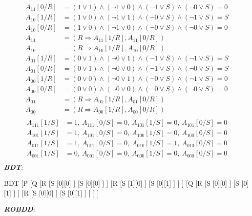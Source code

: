 \documentclass[a4paper,12pt]{article}
\begin{document}
\begin{enumerate}
\begin{align*}
		A_{11}[0/R]&=(1\lor 1)\land(\neg 1\lor 0)\land(\neg 1\lor S)\land (\neg 0\lor S)=0\\
		A_{10}[1/R]&=(1\lor 0)\land(\neg 1\lor 1)\land(\neg 0\lor S)\land (\neg 1\lor S)=S\\
		A_{10}[0/R]&=(1\lor 0)\land(\neg 1\lor 0)\land(\neg 0\lor S)\land (\neg 0\lor S)=0\\
		A_{11}&=(R\Rightarrow A_{11}[1/R],A_{11}[0/R])\\
		A_{10}&=(R\Rightarrow A_{10}[1/R],A_{10}[0/R])\\
		A_{01}[1/R]&=(0\lor 1)\land(\neg 0\lor 1)\land(\neg 1\lor S)\land (\neg 1\lor S)=S\\
		A_{01}[0/R]&=(0\lor 1)\land(\neg 0\lor 0)\land(\neg 1\lor S)\land (\neg 0\lor S)=S\\
		A_{00}[1/R]&=(0\lor 0)\land(\neg 0\lor 1)\land(\neg 0\lor S)\land (\neg 1\lor S)=0\\
		A_{00}[0/R]&=(0\lor 0)\land(\neg 0\lor 0)\land(\neg 0\lor S)\land (\neg 0\lor S)=0\\
		A_{01}&=(R\Rightarrow A_{01}[1/R],A_{01}[0/R])\\
		A_{00}&=(R\Rightarrow A_{00}[1/R],A_{00}[0/R])\\
	\end{align*}
	\begin{align*}
		A_{111}[1/S]&=1,\>A_{111}[0/S]=0,\>A_{101}[1/S]=0,\>A_{101}[0/S]=0\\
		A_{101}[1/S]&=1,\>A_{101}[0/S]=0,\>A_{100}[1/S]=0,\>A_{100}[0/S]=0\\
		A_{011}[1/S]&=1,\>A_{011}[0/S]=0,\>A_{010}[1/S]=1,\>A_{010}[0/S]=0\\
		A_{001}[1/S]&=0,\>A_{001}[0/S]=0,\>A_{000}[1/S]=0,\>A_{000}[0/S]=0\\
	\end{align*}
	\emph{\textbf{BDT}:}\\
	\begin{center}
		\begin{forest}
			BDT
			[P
				[Q
					[R
						[S
							[0][0]
						]
						[S
							[0][0]
						]
					]
					[R
						[S
							[1][0]
						]
						[S
							[0][1]
						]
					]
				]
				[Q
					[R
						[S
							[0][0]
						]
						[S
							[0][1]
						]
					]
					[R
						[S
							[0][0]
						]
						[S
							[0][1]
						]
					]
				]
			]
		\end{forest}
	\end{center}
	\emph{\textbf{ROBDD}:}\\
	\begin{center}

\end{center}
\end{enumerate}
\end{document}
